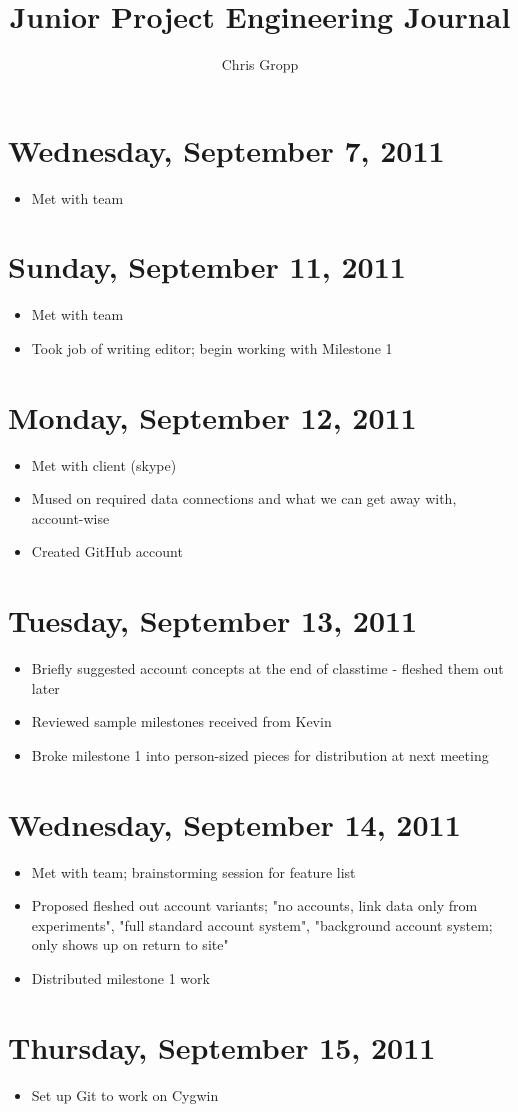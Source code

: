 \documentclass{article}
\title{Junior Project Engineering Journal}
\author{Chris Gropp}
\begin{document}
\maketitle

\section{Wednesday, September 7, 2011}
\begin{itemize}
\item Met with team
\end{itemize}

\section{Sunday, September 11, 2011}
\begin{itemize}
\item Met with team
\item Took job of writing editor; begin working with Milestone 1
\end{itemize}

\section{Monday, September 12, 2011}
\begin{itemize}
\item Met with client (skype)
\item Mused on required data connections and what we can get away with, account-wise
\item Created GitHub account
\end{itemize}

\section{Tuesday, September 13, 2011}
\begin{itemize}
\item Briefly suggested account concepts at the end of classtime - fleshed them out later
\item Reviewed sample milestones received from Kevin
\item Broke milestone 1 into person-sized pieces for distribution at next meeting
\end{itemize}

\section{Wednesday, September 14, 2011}
\begin{itemize}
\item Met with team; brainstorming session for feature list
\item Proposed fleshed out account variants; "no accounts, link data only from experiments", "full standard account system", "background account system; only shows up on return to site"
\item Distributed milestone 1 work
\end{itemize}

\section{Thursday, September 15, 2011}
\begin{itemize}
\item Set up Git to work on Cygwin
\end{itemize}
\end{document}
